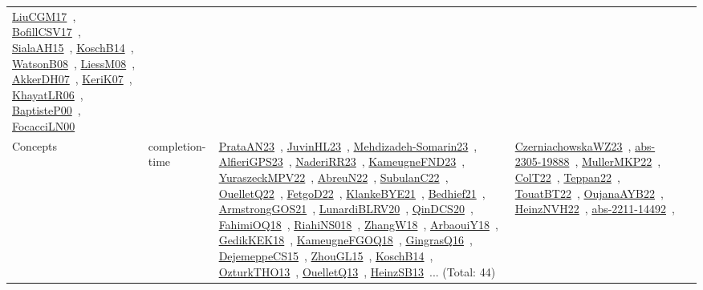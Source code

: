 {\begin{longtable}{lp{3cm}>{\raggedright\arraybackslash}p{6cm}>{\raggedright\arraybackslash}p{6cm}>{\raggedright\arraybackslash}p{8cm}}
\href{papers/LiuCGM17.pdf}{LiuCGM17}~\cite{LiuCGM17}, \href{papers/BofillCSV17.pdf}{BofillCSV17}~\cite{BofillCSV17}, \href{papers/SialaAH15.pdf}{SialaAH15}~\cite{SialaAH15}, \href{papers/KoschB14.pdf}{KoschB14}~\cite{KoschB14}, \href{papers/WatsonB08.pdf}{WatsonB08}~\cite{WatsonB08}, \href{articles/LiessM08.pdf}{LiessM08}~\cite{LiessM08}, \href{papers/AkkerDH07.pdf}{AkkerDH07}~\cite{AkkerDH07}, \href{papers/KeriK07.pdf}{KeriK07}~\cite{KeriK07}, \href{articles/KhayatLR06.pdf}{KhayatLR06}~\cite{KhayatLR06}, \href{articles/BaptisteP00.pdf}{BaptisteP00}~\cite{BaptisteP00}, \href{papers/FocacciLN00.pdf}{FocacciLN00}~\cite{FocacciLN00}\\
Concepts & completion-time & \href{articles/PrataAN23.pdf}{PrataAN23}~\cite{PrataAN23}, \href{papers/JuvinHL23.pdf}{JuvinHL23}~\cite{JuvinHL23}, \href{papers/Mehdizadeh-Somarin23.pdf}{Mehdizadeh-Somarin23}~\cite{Mehdizadeh-Somarin23}, \href{articles/AlfieriGPS23.pdf}{AlfieriGPS23}~\cite{AlfieriGPS23}, \href{articles/NaderiRR23.pdf}{NaderiRR23}~\cite{NaderiRR23}, \href{papers/KameugneFND23.pdf}{KameugneFND23}~\cite{KameugneFND23}, \href{articles/YuraszeckMPV22.pdf}{YuraszeckMPV22}~\cite{YuraszeckMPV22}, \href{articles/AbreuN22.pdf}{AbreuN22}~\cite{AbreuN22}, \href{articles/SubulanC22.pdf}{SubulanC22}~\cite{SubulanC22}, \href{papers/OuelletQ22.pdf}{OuelletQ22}~\cite{OuelletQ22}, \href{articles/FetgoD22.pdf}{FetgoD22}~\cite{FetgoD22}, \href{papers/KlankeBYE21.pdf}{KlankeBYE21}~\cite{KlankeBYE21}, \href{articles/Bedhief21.pdf}{Bedhief21}~\cite{Bedhief21}, \href{papers/ArmstrongGOS21.pdf}{ArmstrongGOS21}~\cite{ArmstrongGOS21}, \href{articles/LunardiBLRV20.pdf}{LunardiBLRV20}~\cite{LunardiBLRV20}, \href{articles/QinDCS20.pdf}{QinDCS20}~\cite{QinDCS20}, \href{articles/FahimiOQ18.pdf}{FahimiOQ18}~\cite{FahimiOQ18}, \href{papers/RiahiNS018.pdf}{RiahiNS018}~\cite{RiahiNS018}, \href{articles/ZhangW18.pdf}{ZhangW18}~\cite{ZhangW18}, \href{papers/ArbaouiY18.pdf}{ArbaouiY18}~\cite{ArbaouiY18}, \href{articles/GedikKEK18.pdf}{GedikKEK18}~\cite{GedikKEK18}, \href{papers/KameugneFGOQ18.pdf}{KameugneFGOQ18}~\cite{KameugneFGOQ18}, \href{papers/GingrasQ16.pdf}{GingrasQ16}~\cite{GingrasQ16}, \href{papers/DejemeppeCS15.pdf}{DejemeppeCS15}~\cite{DejemeppeCS15}, \href{papers/ZhouGL15.pdf}{ZhouGL15}~\cite{ZhouGL15}, \href{papers/KoschB14.pdf}{KoschB14}~\cite{KoschB14}, \href{articles/OzturkTHO13.pdf}{OzturkTHO13}~\cite{OzturkTHO13}, \href{papers/OuelletQ13.pdf}{OuelletQ13}~\cite{OuelletQ13}, \href{articles/HeinzSB13.pdf}{HeinzSB13}~\cite{HeinzSB13}... (Total: 44) & \href{articles/CzerniachowskaWZ23.pdf}{CzerniachowskaWZ23}~\cite{CzerniachowskaWZ23}, \href{articles/abs-2305-19888.pdf}{abs-2305-19888}~\cite{abs-2305-19888}, \href{articles/MullerMKP22.pdf}{MullerMKP22}~\cite{MullerMKP22}, \href{articles/ColT22.pdf}{ColT22}~\cite{ColT22}, \href{papers/Teppan22.pdf}{Teppan22}~\cite{Teppan22}, \href{papers/TouatBT22.pdf}{TouatBT22}~\cite{TouatBT22}, \href{papers/OujanaAYB22.pdf}{OujanaAYB22}~\cite{OujanaAYB22}, \href{articles/HeinzNVH22.pdf}{HeinzNVH22}~\cite{HeinzNVH22}, \href{articles/abs-2211-14492.pdf}{abs-2211-14492}~\cite{abs-2211-14492}, 
\end{longtable}}
